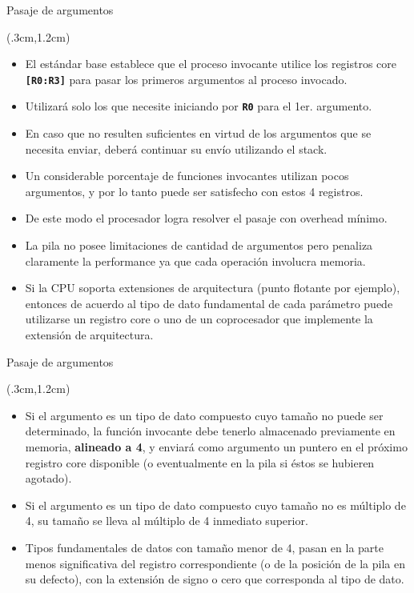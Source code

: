 \documentclass[usenames,table,dvipsnames,aspectratio=169]{beamer}
\begin{document}
\begin{frame}{Pasaje de argumentos}
 \begin{textblock*}{\textwidth}(.3cm,1.2cm)
  \begin{itemize}[<+(1)->] \justifying %
   \item El estándar base establece que el proceso invocante utilice los registros core \textbf{\texttt{[R0:R3]}} para pasar los primeros argumentos al proceso invocado. 
   \item Utilizará solo los que necesite iniciando por \textbf{\texttt{R0}} para el 1er. argumento.
   \item En caso que no resulten suficientes en virtud de los argumentos que se necesita enviar, deberá continuar su envío utilizando el stack.
   \item Un considerable porcentaje de funciones invocantes utilizan pocos argumentos, y por lo tanto puede ser satisfecho con estos 4 registros. 
   \item De este modo el procesador logra resolver el pasaje con overhead mínimo.
   \item La pila no posee limitaciones de cantidad de argumentos pero penaliza claramente la performance ya que cada operación involucra memoria.
   \item Si la CPU soporta extensiones de arquitectura (punto flotante por ejemplo), entonces de acuerdo al tipo de dato fundamental de cada parámetro puede utilizarse un registro core o uno de un coprocesador que implemente la extensión de arquitectura.
  \end{itemize}
 \end{textblock*}
\end{frame}

\begin{frame}{Pasaje de argumentos}
 \begin{textblock*}{\textwidth}(.3cm,1.2cm)
  \begin{itemize}[<+->] \justifying \parskip 0.3cm
   \item Si el argumento es un tipo de dato compuesto cuyo tamaño no puede ser determinado, la función invocante debe tenerlo almacenado previamente en memoria, \textbf{alineado a \SI{4}{\byte}}, y enviará como argumento un puntero en el próximo registro core disponible (o eventualmente en la pila si éstos se hubieren agotado).
   \item Si el argumento es un tipo de dato compuesto cuyo tamaño no es múltiplo de 4, su tamaño se lleva al múltiplo de 4 inmediato superior.
   \item Tipos fundamentales de datos con tamaño menor de \SI{4}{\byte}, pasan en la parte menos significativa del registro correspondiente (o de la posición de la pila en su defecto), con la extensión de signo o cero que corresponda al tipo de dato.
  \end{itemize}
 \end{textblock*}
\end{frame}
\end{document}
